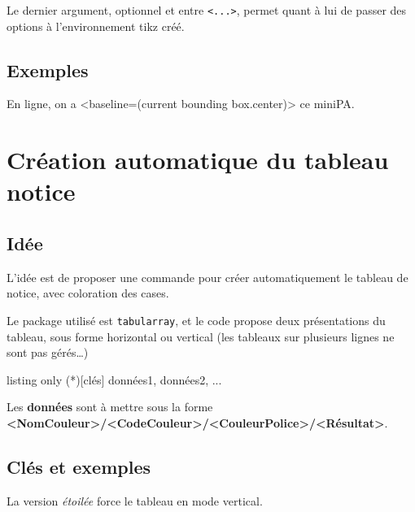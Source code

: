 \documentclass{article}
\newcommand\Cle[1]{{\bfseries\sffamily\textlangle #1\textrangle}}
\begin{document}
Le dernier argument, optionnel et entre \texttt{<...>}, permet quant à lui de passer des options à l'environnement \textsf{tikz} créé.

\subsection{Exemples}

\begin{PresentationCode}{}
\end{PresentationCode}

\begin{PresentationCode}{}
En ligne, on a <baseline=(current bounding box.center)> ce miniPA.
\end{PresentationCode}

\newpage

\section{Création automatique du tableau notice}

\subsection{Idée}

L'idée est de proposer une commande pour créer automatiquement le tableau de notice, avec coloration des cases.

\smallskip

Le package utilisé est \texttt{tabularray}, et le code propose deux présentations du tableau, sous forme horizontal ou vertical (les tableaux sur plusieurs lignes ne sont pas gérés\ldots)

\begin{PresentationCode}{listing only}
\TablCouleursPixelArt(*)[clés]{%
	données1,%
	données2,%
	...
}
\end{PresentationCode}

Les \Cle{données} sont à mettre sous la forme \Cle{<NomCouleur>/<CodeCouleur>/<CouleurPolice>/<Résultat>}.

\subsection{Clés et exemples}

La version \textit{étoilée} force le tableau en mode vertical.
\end{document}

